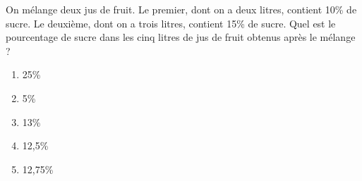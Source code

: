 On mélange deux jus de fruit. Le premier, dont on a deux litres,
contient 10\% de sucre. Le deuxième, dont on a trois litres, contient
15\% de sucre. Quel est le pourcentage de sucre dans les cinq litres
de jus de fruit obtenus après le mélange ?
\begin{multicols}{5}
  \begin{enumerate}[A/]
  \item 25\%
  \item 5\%
  \item 13\%
  \item 12,5\%
  \item 12,75\%
  \end{enumerate}
\end{multicols}